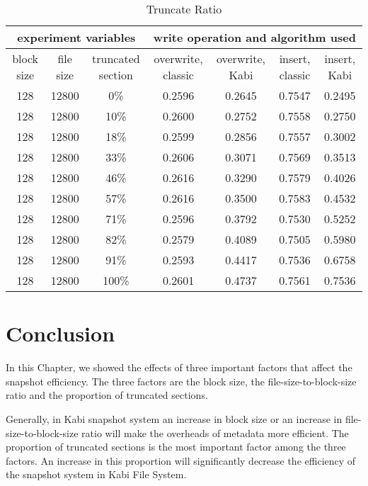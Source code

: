 \begin{lscape} 
\begin{table}
\caption{Truncate Ratio}
\label{tab:truncate_ratio}
\begin{center}
\begin{tabular}{|c|c|c|c|c|c|c|}
\hline
\multicolumn{3}{|c|}{experiment variables} & \multicolumn{4}{c|}{write operation and algorithm used} \\
\hline
block size & file size & truncated section & overwrite, classic & overwrite, Kabi & insert, classic & insert, Kabi\\
\hline
128 & 12800 & 0\% & 0.2596 & 0.2645 & 0.7547 & 0.2495 \\
\hline
128 & 12800 & 10\% & 0.2600 & 0.2752 & 0.7558 & 0.2750 \\
\hline
128 & 12800 & 18\% & 0.2599 & 0.2856 & 0.7557 & 0.3002 \\
\hline
128 & 12800 & 33\% & 0.2606 & 0.3071 & 0.7569 & 0.3513 \\
\hline
128 & 12800 & 46\% & 0.2616 & 0.3290 & 0.7579 & 0.4026 \\
\hline
128 & 12800 & 57\% & 0.2616 & 0.3500 & 0.7583 & 0.4532 \\
\hline
128 & 12800 & 71\% & 0.2596 & 0.3792 & 0.7530 & 0.5252 \\
\hline
128 & 12800 & 82\% & 0.2579 & 0.4089 & 0.7505 & 0.5980 \\
\hline
128 & 12800 & 91\% & 0.2593 & 0.4417 & 0.7536 & 0.6758 \\
\hline
128 & 12800 & 100\% & 0.2601 & 0.4737 & 0.7561 & 0.7536 \\
\hline
\end{tabular}
\end{center}
\end{table}
\end{lscape}

\section{Conclusion}

    In this Chapter, we showed the effects of three important factors that affect the snapshot efficiency. The three factors are the block size, the file-size-to-block-size ratio and the proportion of truncated sections.

    Generally, in Kabi snapshot system an increase in block size or an increase in file-size-to-block-size ratio will make the overheads of metadata more efficient. The proportion of truncated sections is the most important factor among the three factors. An increase in this proportion will significantly decrease the efficiency of the snapshot system in Kabi File System.
